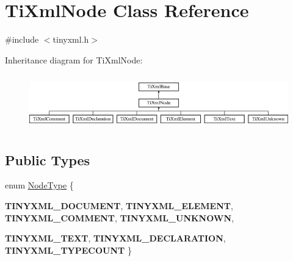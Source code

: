 \hypertarget{class_ti_xml_node}{
\section{TiXmlNode Class Reference}
\label{class_ti_xml_node}
}


{\ttfamily \#include $<$tinyxml.h$>$}

Inheritance diagram for TiXmlNode:\begin{figure}[H]
\begin{center}
\leavevmode
\includegraphics[height=2.413793cm]{class_ti_xml_node}
\end{center}
\end{figure}
\subsection*{Public Types}
\begin{DoxyCompactItemize}
\item 
enum \hyperlink{class_ti_xml_node_a836eded4920ab9e9ef28496f48cd95a2}{NodeType} \{ \par
{\bfseries TINYXML\_\-DOCUMENT}, 
{\bfseries TINYXML\_\-ELEMENT}, 
{\bfseries TINYXML\_\-COMMENT}, 
{\bfseries TINYXML\_\-UNKNOWN}, 
\par
{\bfseries TINYXML\_\-TEXT}, 
{\bfseries TINYXML\_\-DECLARATION}, 
{\bfseries TINYXML\_\-TYPECOUNT}
 \}
\end{DoxyCompactItemize}
